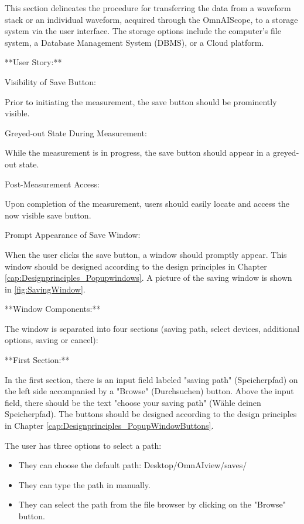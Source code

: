 \documentclass[]{scrreprt}
\begin{document}
This section delineates the procedure for transferring the data from a waveform stack or an individual waveform, acquired through the OmnAIScope, to a storage system via the user interface. The storage options include the computer's file system, a Database Management System (DBMS), or a Cloud platform.

**User Story:**

Visibility of Save Button:

Prior to initiating the measurement, the save button should be prominently visible.

Greyed-out State During Measurement:

While the measurement is in progress, the save button should appear in a greyed-out state.

Post-Measurement Access:

Upon completion of the measurement, users should easily locate and access the now visible save button.

Prompt Appearance of Save Window:

When the user clicks the save button, a window should promptly appear. This window should be designed according to the design principles in Chapter \ref{cap:Designprinciples_Popupwindows}. A picture of the saving window is shown in \ref{fig:SavingWindow}.

**Window Components:**

The window is separated into four sections (saving path, select devices, additional options, saving or cancel):

**First Section:**

In the first section, there is an input field labeled "saving path" (Speicherpfad) on the left side accompanied by a "Browse" (Durchsuchen) button. Above the input field, there should be the text "choose your saving path" (Wähle deinen Speicherpfad). The buttons should be designed according to the design principles in Chapter \ref{cap:Designprinciples_PopupWindowButtons}.

The user has three options to select a path:
\begin{itemize}
    \item They can choose the default path: Desktop/OmnAIview/saves/
    \item They can type the path in manually.
    \item They can select the path from the file browser by clicking on the "Browse" button.
\end{itemize}
\end{document}
